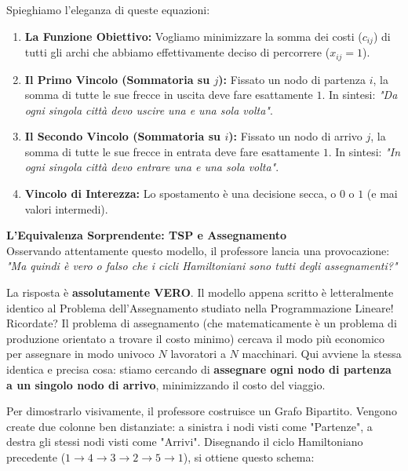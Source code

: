 \documentclass[12pt, a4paper]{article}
\begin{document}
	Spieghiamo l'eleganza di queste equazioni:
	\begin{enumerate}
		\item \textbf{La Funzione Obiettivo:} Vogliamo minimizzare la somma dei costi ($c_{ij}$) di tutti gli archi che abbiamo effettivamente deciso di percorrere ($x_{ij}=1$).
		\item \textbf{Il Primo Vincolo (Sommatoria su $j$):} Fissato un nodo di partenza $i$, la somma di tutte le sue frecce in uscita deve fare esattamente $1$. In sintesi: \textit{"Da ogni singola città devo uscire una e una sola volta"}.
		\item \textbf{Il Secondo Vincolo (Sommatoria su $i$):} Fissato un nodo di arrivo $j$, la somma di tutte le sue frecce in entrata deve fare esattamente $1$. In sintesi: \textit{"In ogni singola città devo entrare una e una sola volta"}.
		\item \textbf{Vincolo di Interezza:} Lo spostamento è una decisione secca, o $0$ o $1$ (e mai valori intermedi).
	\end{enumerate}
	
	\vspace{0.4cm}
	\textbf{L'Equivalenza Sorprendente: TSP e Assegnamento}\\
	Osservando attentamente questo modello, il professore lancia una provocazione: \textit{"Ma quindi è vero o falso che i cicli Hamiltoniani sono tutti degli assegnamenti?"}
	
	La risposta è \textbf{assolutamente VERO}.
	Il modello appena scritto è letteralmente identico al Problema dell'Assegnamento studiato nella Programmazione Lineare! Ricordate? Il problema di assegnamento (che matematicamente è un problema di produzione orientato a trovare il costo minimo) cercava il modo più economico per assegnare in modo univoco $N$ lavoratori a $N$ macchinari. 
	Qui avviene la stessa identica e precisa cosa: stiamo cercando di \textbf{assegnare ogni nodo di partenza a un singolo nodo di arrivo}, minimizzando il costo del viaggio.
	
	Per dimostrarlo visivamente, il professore costruisce un Grafo Bipartito. Vengono create due colonne ben distanziate: a sinistra i nodi visti come "Partenze", a destra gli stessi nodi visti come "Arrivi". 
	Disegnando il ciclo Hamiltoniano precedente ($1 \rightarrow 4 \rightarrow 3 \rightarrow 2 \rightarrow 5 \rightarrow 1$), si ottiene questo schema:
	
\end{document}
